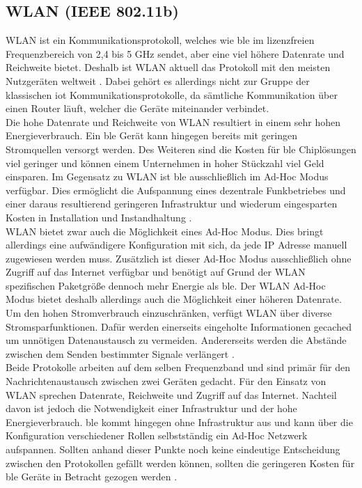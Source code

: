 \subsection{WLAN (IEEE 802.11b)}
\label{ss:vergleich:wlan}

\noindent WLAN ist ein Kommunikationsprotokoll, welches wie \ac{ble} im lizenzfreien Frequenzbereich von 2,4 bis 5 GHz sendet, aber eine viel höhere Datenrate und Reichweite bietet. Deshalb ist WLAN aktuell das Protokoll mit den meisten Nutzgeräten weltweit \cite[Seite 193f]{Gessler15:WNN}. Dabei gehört es allerdings nicht zur Gruppe der klassischen \ac{iot} Kommunikationsprotokolle, da sämtliche Kommunikation über einen Router läuft, welcher die Geräte miteinander verbindet.\\
\noindent Die hohe Datenrate und Reichweite von WLAN resultiert in einem sehr hohen Energieverbrauch. Ein \ac{ble} Gerät kann hingegen bereits mit geringen Stromquellen versorgt werden. Des Weiteren sind die Kosten für \ac{ble} Chiplösungen viel geringer und können einem Unternehmen in hoher Stückzahl viel Geld einsparen. Im Gegensatz zu WLAN ist \ac{ble} ausschließlich im Ad-Hoc Modus verfügbar. Dies ermöglicht die Aufspannung eines dezentrale Funkbetriebes und einer daraus resultierend geringeren Infrastruktur und wiederum eingesparten Kosten in Installation und Instandhaltung \cite[Seite 206]{Gessler15:WNN}.\\
\noindent WLAN bietet zwar auch die Möglichkeit eines Ad-Hoc Modus. Dies bringt allerdings eine aufwändigere Konfiguration mit sich, da jede IP Adresse manuell zugewiesen werden muss. Zusätzlich ist dieser Ad-Hoc Modus ausschließlich ohne Zugriff auf das Internet verfügbar und benötigt auf Grund der WLAN spezifischen Paketgröße dennoch mehr Energie als \ac{ble}. Der WLAN Ad-Hoc Modus bietet deshalb allerdings auch die Möglichkeit einer höheren Datenrate. Um den hohen Stromverbrauch einzuschränken, verfügt WLAN über diverse Stromsparfunktionen. Dafür werden einerseits eingeholte Informationen gecached um unnötigen Datenaustausch zu vermeiden. Andererseits werden die Abstände zwischen dem Senden bestimmter Signale verlängert \cite[Seite 240ff]{Gessler15:WNN}.\\ 
\noindent Beide Protokolle arbeiten auf dem selben Frequenzband und sind primär für den Nachrichtenaustausch zwischen zwei Geräten gedacht. Für den Einsatz von WLAN sprechen Datenrate, Reichweite und Zugriff auf das Internet. Nachteil davon ist jedoch die Notwendigkeit einer Infrastruktur und der hohe Energieverbrauch. \ac{ble} kommt hingegen ohne Infrastruktur aus und kann über die Konfiguration verschiedener Rollen selbstständig ein Ad-Hoc Netzwerk aufspannen. Sollten anhand dieser Punkte noch keine eindeutige Entscheidung zwischen den Protokollen gefällt werden können, sollten die geringeren Kosten für \ac{ble} Geräte in Betracht gezogen werden \cite[Seite 271]{Gessler15:WNN}.\\   

